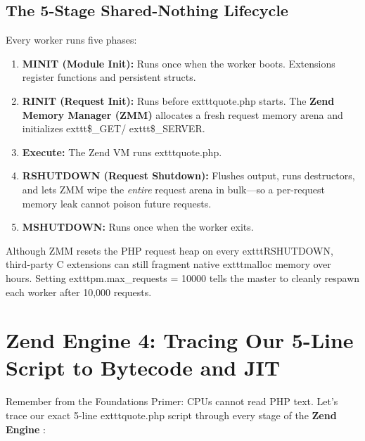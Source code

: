 \subsection{The 5-Stage Shared-Nothing Lifecycle}

Every worker runs five phases:
\begin{enumerate}[leftmargin=15pt]
  \item \textbf{MINIT (Module Init):} Runs once when the worker boots. Extensions register functions and persistent structs.
  \item \textbf{RINIT (Request Init):} Runs before 	exttt{quote.php} starts. The \textbf{Zend Memory Manager (ZMM)} allocates a fresh request memory arena and initializes 	exttt{\$\_GET}/	exttt{\$\_SERVER}.
  \item \textbf{Execute:} The Zend VM runs 	exttt{quote.php}.
  \item \textbf{RSHUTDOWN (Request Shutdown):} Flushes output, runs destructors, and lets ZMM wipe the \emph{entire} request arena in bulk---so a per-request memory leak cannot poison future requests.
  \item \textbf{MSHUTDOWN:} Runs once when the worker exits.
\end{enumerate}

\begin{productionwarningbox}
Although ZMM resets the PHP request heap on every 	exttt{RSHUTDOWN}, third-party C extensions can still fragment native 	exttt{malloc} memory over hours. Setting 	exttt{pm.max\_requests = 10000} tells the master to cleanly respawn each worker after 10,000 requests.
\end{productionwarningbox}

\section{Zend Engine 4: Tracing Our 5-Line Script to Bytecode and JIT}

Remember from the Foundations Primer: CPUs cannot read PHP text. Let's trace our exact 5-line 	exttt{quote.php} script through every stage of the \textbf{Zend Engine} \cite{phpinternals}:

